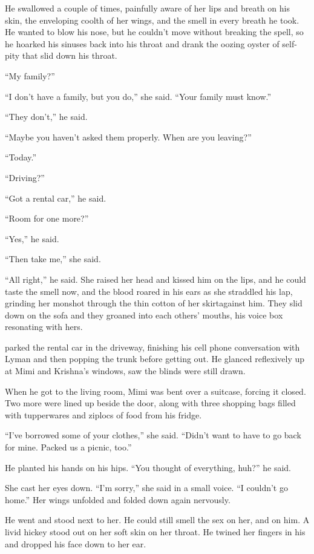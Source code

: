 He swallowed a couple of times, painfully aware of her lips and breath
on his skin, the enveloping coolth of her wings, and the smell in
every breath he took.  He wanted to blow his nose, but he couldn't
move without breaking the spell, so he hoarked his sinuses back into
his throat and drank the oozing oyster of self-pity that slid down his
throat.

``My family?''

``I don't have a family, but you do,'' she said.  ``Your family must
know.''

``They don't,'' he said.

``Maybe you haven't asked them properly.  When are you leaving?''

``Today.''

``Driving?''

``Got a rental car,'' he said.

``Room for one more?''

``Yes,'' he said.

``Then take me,'' she said.

``All right,'' he said.  She raised her head and kissed him on the
lips, and he could taste the smell now, and the blood roared in his
ears as she straddled his lap, grinding her mons\dash{}hot through the
thin cotton of her skirt\dash{}against him.  They slid down on the sofa
and they groaned into each others' mouths, his voice box resonating
with hers.

 parked the rental car in the driveway, finishing his cell phone
conversation with Lyman and then popping the trunk before getting out. 
He glanced reflexively up at Mimi and Krishna's windows, saw the
blinds were still drawn.

When he got to the living room, Mimi was bent over a suitcase, forcing
it closed.  Two more were lined up beside the door, along with three
shopping bags filled with tupperwares and ziplocs of food from his
fridge.

``I've borrowed some of your clothes,'' she said.  ``Didn't want to
have to go back for mine.  Packed us a picnic, too.''

He planted his hands on his hips.  ``You thought of everything, huh?''
he said.

She cast her eyes down.  ``I'm sorry,'' she said in a small voice. 
``I couldn't go home.'' Her wings unfolded and folded down again
nervously.

He went and stood next to her.  He could still smell the sex on her,
and on him.  A livid hickey stood out on her soft skin on her throat. 
He twined her fingers in his and dropped his face down to her ear.

